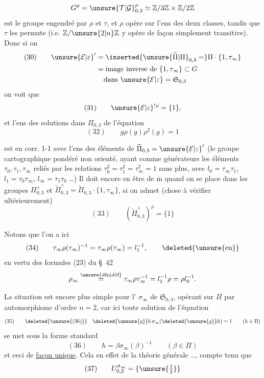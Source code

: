 \[
G^\rho=\unsure{\mathcal T|\mathcal G}_{0,3}^{\rho}
\simeq\mathbb Z/3\mathbb Z\times\mathbb Z/2\mathbb Z
\]
est le groupe engendré par $\rho$ et $\tau$, et $\rho$ opère  sur l'ens des deux classes, tandis que $\tau$ les permute (i.e. $\mathbb Z/\unsure{2|n}\mathbb Z$  y opère de façon simplement transitive).
Donc si on 
\[
\begin{aligned}
(30)\qquad\unsure{\mathcal E|\varepsilon}'
&=\inserted{\unsure{\widetilde\Pi|\Pi}_{0,3}=}\Pi\cdot\{1,\tau_\infty\}\\
&=\text{image inverse de }\{1,\tau_\infty\}\subset G\\
&\phantom{={}}\text{dans }\unsure{\mathcal E|\varepsilon}=\mathfrak S_{0,3}
\end{aligned}
\]
on voit que
\[
(31)\qquad\unsure{\mathcal E|\varepsilon}'{}^\rho=\{1\},
\]
et l'ens des solutions dans \uline{$\Pi_{0,3}$} de l'équation
\[
(32)\qquad g\rho(g)\rho^2(g)=1
\]


est en corr. 1-1 avec l'ens des éléments de $\widetilde\Pi_{0,3}=\unsure{\mathcal E|\varepsilon}'$ (le groupe cartographique  pondéré non orienté, ayant comme générateurs les éléments $\tau_0,\tau_1,\tau_\infty$ reliés par les relations $\tau_0^2=\tau_1^2=\tau_\infty^2=1$ sans plus, avec $l_0=\tau_\infty\tau_1$, $l_1=\tau_0\tau_\infty$, $l_\infty=\tau_1\tau_0$ \dots)
Il doit encore en être de $\overline{\mathrm m}$ quand on se place dans les groupes $\Pi_{0,3}^{\wedge}$ et $\widetilde\Pi_{0,3}^{\wedge}=\widetilde\Pi_{0,3}\cdot\{1,\tau_\infty\}$, si on admet (chose à vérifier ultérieurement)
\[
(33)\qquad(\widetilde\Pi_{0,3}^{\wedge})^\rho=\{1\}
\]

Notons que l'on a ici
\[
(34)\qquad\tau_\infty\rho(\tau_\infty)^{-1}
=\tau_\infty\rho(\tau_\infty)=l_1^{-1},
\qquad\deleted{\unsure{\text{en}}}
\]
en vertu des formules (23) du \S\ 42
\[
\rho_\infty\overset{\unsure{\mathrm{dfn}|\text{déf}}}{=}
\tau_\infty\rho\tau_\infty^{-1}
=l_1^{-1}\rho=\rho l_0^{-1}.
\]

La situation est encore plus simple pour l' $\sigma_\infty$ de $\mathfrak S_{0,3}$, opérant sur $\Pi$ par automorphisme d'ordre $n=2$, car ici toute solution de l'équation 
\[
(35)\qquad\deleted{\unsure{(36)}}\quad
\deleted{\unsure{g}}h\,\sigma_\infty(\deleted{\unsure{g}}h)=1
\qquad(h\in\Pi)
\]
se met sous la forme standard
\[
(36)\qquad h=\beta\sigma_\infty(\beta)^{-1}
\qquad(\beta\in\Pi)
\]
et ceci de \uline{façon unique}. Cela  en effet de la théorie générale \dots, compte tenu que
\[
(37)\qquad U_{0,3}^{\dot\sigma_\infty}=\{\unsure{\tfrac12}\}
\]
